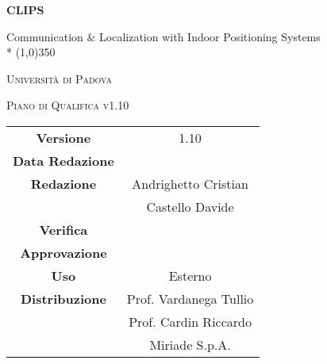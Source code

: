 \documentclass[a4paper,12pt]{article}
\author{Andrighetto Cristian, Castello Davide}
\date{27/12/2015}
\begin{document}
	\begin{titlepage}
		\centering
	{\huge\bfseries CLIPS\par}
	Communication \& Localization with Indoor Positioning Systems \\*
	\line(1,0){350} \\
	{\scshape\LARGE Università di Padova \par}
	\vspace{1cm}
	{\scshape\Large Piano di Qualifica v1.10 \par}
	\logo
	\newpage
		\begin{tabular}{c|c}
			{\hfill \textbf{Versione}} 			& 1.10 \\
			{\hfill\textbf{Data Redazione}} 		&   		\\ 
			{\hfill\textbf{Redazione}} 			&  Andrighetto Cristian \\ 
											& Castello Davide       \\
			{\hfill\textbf{Verifica}} 				&     \\
			{\hfill\textbf{Approvazione}} 		&  \\
			{\hfill\textbf{Uso}} 					& Esterno			\\
			{\hfill\textbf{Distribuzione}} 			& Prof. Vardanega Tullio \\
											& Prof. Cardin Riccardo \\
											& Miriade S.p.A.
		\end{tabular}
	\end{titlepage}
	
	\newpage
	\pagestyle{myfront}
		
	
	\newpage
		\tableofcontents
	
	\newpage
		\listoftables
	
	\label{LastFrontPage}
	\newpage
		\pagestyle{mymain}
	
\newpage
	
\newpage
	
\newpage
	
\newpage
	
\newpage
	
\newpage
	
\newpage
	
\label{LastPage}
\end{document}

